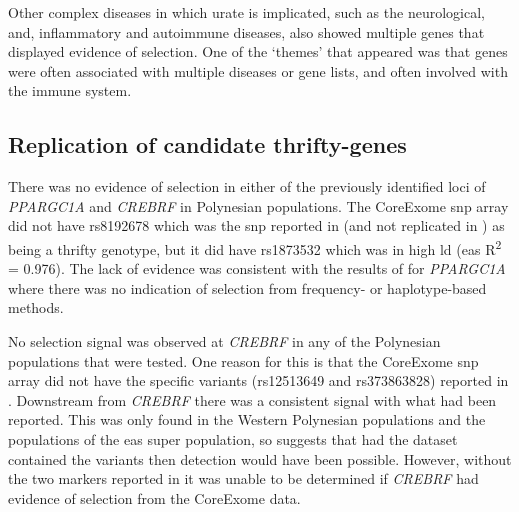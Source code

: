 \documentclass[]{report}
\begin{document}
Other complex diseases in which urate is implicated, such as the
neurological, and, inflammatory and autoimmune diseases, also showed
multiple genes that displayed evidence of selection. One of the `themes'
that appeared was that genes were often associated with multiple
diseases or gene lists, and often involved with the immune system.

\subsection{Replication of candidate
thrifty-genes}\label{replication-of-candidate-thrifty-genes}

There was no evidence of selection in either of the previously
identified loci of \emph{PPARGC1A} and \emph{CREBRF} in Polynesian
populations. The CoreExome \gls{snp} array did not have rs8192678 which
was the \gls{snp} reported in \citet{Myles2011} (and not replicated in
\citet{Cadzow2016}) as being a thrifty genotype, but it did have
rs1873532 which was in high \gls{ld} (\gls{eas} R\textsuperscript{2} =
0.976). The lack of evidence was consistent with the results of
\citet{Cadzow2016} for \emph{PPARGC1A} where there was no indication of
selection from frequency- or haplotype-based methods.

No selection signal was observed at \emph{CREBRF} in any of the
Polynesian populations that were tested. One reason for this is that the
CoreExome \gls{snp} array did not have the specific variants (rs12513649
and rs373863828) reported in \citet{Minster2016}. Downstream from
\emph{CREBRF} there was a consistent signal with what had been reported.
This was only found in the Western Polynesian populations and the
populations of the \gls{eas} super population, so suggests that had the
dataset contained the variants then detection would have been possible.
However, without the two markers reported in \citet{Minster2016} it was
unable to be determined if \emph{CREBRF} had evidence of selection from
the CoreExome data.
\end{document}
